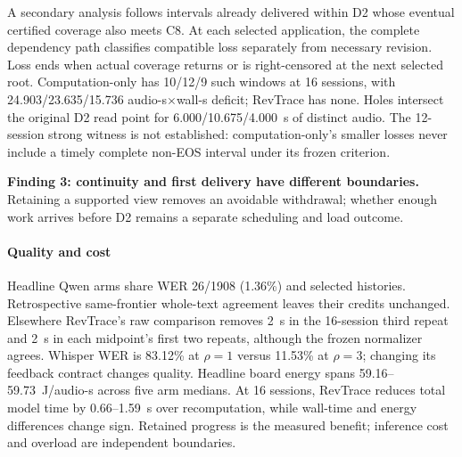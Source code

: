 A secondary analysis follows intervals already delivered within D2 whose
eventual certified coverage also meets C8. At each selected application,
the complete dependency path classifies compatible loss separately from
necessary revision. Loss ends when actual coverage returns or is
right-censored at the next selected root. Computation-only has 10/12/9
such windows at 16 sessions, with 24.903/23.635/15.736 audio-s$\times$wall-s
deficit; RevTrace has none. Holes intersect the original D2 read point
for 6.000/10.675/4.000~s of distinct audio. The 12-session strong witness
is not established: computation-only's smaller losses never include a
timely complete non-EOS interval under its frozen criterion.
\par\noindent\textbf{Finding 3: continuity and first delivery have different boundaries.}
Retaining a supported view removes an avoidable withdrawal; whether
enough work arrives before D2 remains a separate scheduling and load outcome.

\paragraph{Quality and cost}
Headline Qwen arms share WER 26/1908 (1.36\%) and selected histories.
Retrospective same-frontier whole-text agreement leaves their credits
unchanged. Elsewhere RevTrace's raw comparison removes 2~s in the 16-session third
repeat and 2~s in each midpoint's first two repeats, although the frozen
normalizer agrees. Whisper WER is 83.12\% at $\rho=1$ versus 11.53\% at
$\rho=3$; changing its feedback contract changes quality. Headline board
energy spans 59.16--59.73~J/audio-s across five arm medians. At 16 sessions, RevTrace reduces total
model time by 0.66--1.59~s over recomputation, while wall-time and energy
differences change sign. Retained progress is the measured benefit;
inference cost and overload are independent boundaries.
